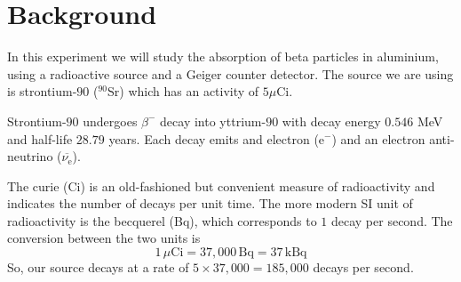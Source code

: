 \section{Background}%

In this experiment we will study the absorption of beta particles in aluminium, using a radioactive source and a Geiger counter detector. The source we are using is strontium-$90$ ($^{90}$Sr) which has an activity of $5 \mu$Ci. 

Strontium-$90$ undergoes $\beta^{-}$ decay into yttrium-$90$ with decay energy $0.546$ MeV and half-life $28.79$ years. Each decay emits and electron ($\mathrm{e}^-$) and an electron anti-neutrino ($\overbar{\nu_\mathrm{e}}$).

The curie (Ci) is an old-fashioned but convenient measure of radioactivity and indicates the number of decays per unit time. The more modern SI unit of radioactivity is the becquerel (Bq), which corresponds to $1$ decay per second. The conversion between the two units is 
\begin{displaymath}
  1\,\mu\textrm{Ci} = 37,000\,\textrm{Bq} = 37\,\textrm{kBq} 
\end{displaymath}
So, our source decays at a rate of $5\times37,000=185,000$ decays per second.

